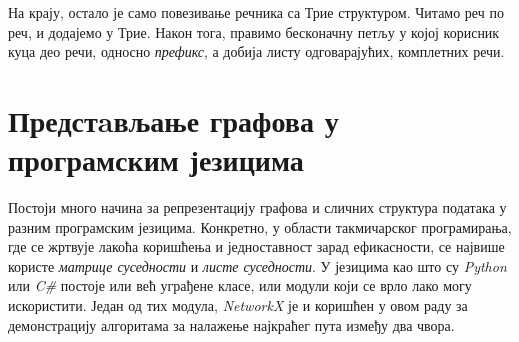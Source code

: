 \documentclass[11pt, oneside, a4paper]{article}
\begin{document}
На крају, остало је само повезивање речника са Трие структуром. Читамо реч по реч, и додајемо у Трие. Након тога, правимо бесконачну петљу у којој корисник куца део речи, односно \textit{префикс}, а добија листу одговарајућих, комплетних речи.

\newpage

\section{Предстaвљање графова у
\\ програмским језицима}
Постоји много начина за репрезентацију графова и сличних структура података у разним програмским језицима. Конкретно, у области такмичарског програмирања, где се жртвује лакоћа коришћења и једноставност зарад ефикасности, се највише користе \textit{матрице суседности} и \textit{листе суседности}. У језицима као што су \textit{Python} или \textit{C\#} постоје или већ уграђене класе, или модули који се врло лако могу искористити. Један од тих модула, \textit{NetworkX} је и коришћен у овом раду за демонстрацију алгоритама за налажење најкраћег пута између два чвора.
\end{document}
